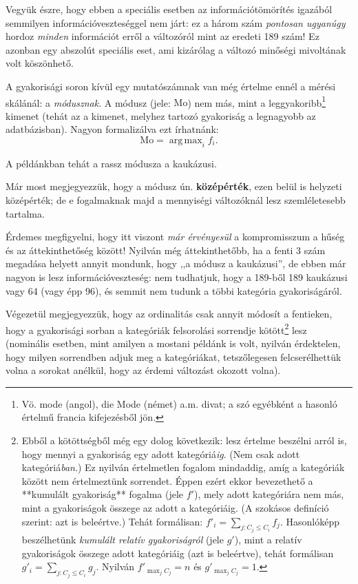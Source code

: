 \documentclass[]{book}
\let\rmarkdownfootnote\footnote%
\def\footnote{\protect\rmarkdownfootnote}
\begin{document}
Vegyük észre, hogy ebben a speciális esetben az információtömörítés
igazából semmilyen információveszteséggel nem járt: ez a három szám
\emph{pontosan ugyanúgy} hordoz \emph{minden} információt erről a
változóról mint az eredeti 189 szám! Ez azonban egy abszolút speciális
eset, ami kizárólag a változó minőségi mivoltának volt köszönhető.

A gyakorisági soron kívül egy mutatószámnak van még értelme ennél a
mérési skálánál: a \emph{módusznak}. A módusz (jele: \(\mathrm{Mo}\))
nem más, mint a
leggyakoribb\footnote{Vö. mode (angol), die Mode (német) a.m. divat; a szó egyébként a hasonló értelmű francia kifejezésből jön.}
kimenet (tehát az a kimenet, melyhez tartozó gyakoriság a legnagyobb az
adatbázisban). Nagyon formalizálva ezt írhatnánk: \[
    \mathrm{Mo}=\mathop{\mathrm{arg\,max}}_i f_i.
\]

A példánkban tehát a rassz módusza a kaukázusi.

Már most megjegyezzük, hogy a módusz ún. \textbf{középérték}, ezen belül
is helyzeti középérték; de e fogalmaknak majd a mennyiségi változóknál
lesz szemléletesebb tartalma.

Érdemes megfigyelni, hogy itt viszont \emph{már érvényesül} a
kompromisszum a hűség és az áttekinthetőség között! Nyilván még
áttekinthetőbb, ha a fenti 3 szám megadása helyett annyit mondunk, hogy
,,a módusz a kaukázusi'', de ebben már nagyon is lesz
információveszteség: nem tudhatjuk, hogy a 189-ből 189 kaukázusi vagy 64
(vagy épp 96), és semmit nem tudunk a többi kategória gyakoriságáról.

Végezetül megjegyezzük, hogy az ordinalitás csak annyit módosít a
fentieken, hogy a gyakorisági sorban a kategóriák felsorolási sorrendje
kötött\footnote{Ebből a kötöttségből még egy dolog következik: lesz értelme beszélni arról is, hogy mennyi a gyakoriság egy adott kategóriá\emph{ig}. (Nem csak adott kategóriá\emph{ban}.) Ez nyilván értelmetlen fogalom mindaddig, amíg a kategóriák között nem értelmeztünk sorrendet. Éppen ezért ekkor bevezethető a **kumulált gyakoriság** fogalma (jele $f'$), mely adott kategóriára nem más, mint a gyakoriságok összege az adott a kategóriáig. (A szokásos definíció szerint: azt is beleértve.) Tehát formálisan: $f'_i=\sum_{j:C_j\leq C_i} f_j$. Hasonlóképp beszélhetünk \emph{kumulált relatív gyakoriságról} (jele $g'$), mint a relatív gyakoriságok összege adott kategóriáig (azt is beleértve), tehát formálisan $g'_i=\sum_{j:C_j\leq C_i} g_j$. Nyilván $f'_{\max_j C_j}=n$ és $g'_{\max_j C_j}=1$.}
lesz (nominális esetben, mint amilyen a mostani példánk is volt, nyilván
érdektelen, hogy milyen sorrendben adjuk meg a kategóriákat,
tetszőlegesen felcserélhettük volna a sorokat anélkül, hogy az érdemi
változást okozott volna).
\end{document}
